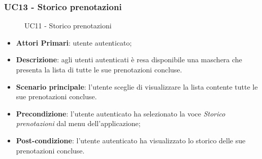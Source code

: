 \subsubsection{UC13 - Storico prenotazioni}
 \begin{figure}[h]
	\centering
	\caption{UC11 - Storico prenotazioni}
\end{figure}
\begin{itemize}
	\item \textbf{Attori Primari}: utente autenticato;
	\item \textbf{Descrizione}: agli utenti autenticati è resa disponibile una maschera che presenta la lista di tutte le sue prenotazioni concluse. 
	\item \textbf{Scenario principale}: l'utente sceglie di visualizzare la lista contente tutte le sue prenotazioni concluse.
	\item \textbf{Precondizione}: l'utente autenticato ha selezionato la voce \textit{Storico prenotazioni} dal menu dell'applicazione;
	\item \textbf{Post-condizione}: l'utente autenticato ha visualizzato lo storico delle sue prenotazioni concluse. 
\end{itemize} 
